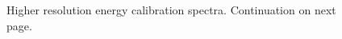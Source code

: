 \begin{figure}[h]
	\hfill
	\hfill
	\hfill
	\caption[LYSO energy calibration spectra (detailed)]{Higher resolution energy calibration spectra. Continuation on next page. }
	\label{ap:B:energy_spectra1}
\end{figure}



